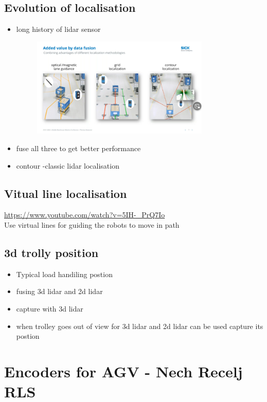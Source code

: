 \documentclass[a4paper]{article}
\begin{document}
\subsection{Evolution of localisation}
\begin{itemize}
	\item long history of lidar sensor
	      \begin{figure}[htpb]
		      \centering
		      \includegraphics[width=0.8\textwidth]{datafusion.png}
		      \caption{}
		      \label{fig:}
	      \end{figure}
	\item fuse all three to get better performance
	\item contour -classic lidar localisation
\end{itemize}
\subsection{Vitual line localisation}
\url{https://www.youtube.com/watch?v=5IH-_PrQ7Io} \\
Use virtual lines for guiding the robots to move in path
\subsection{3d trolly position}
\begin{itemize}
	\item Typical load handiling postion
	\item fusing 3d lidar and 2d lidar
	\item capture with 3d lidar
	\item when trolley goes out of view for 3d lidar and 2d lidar can be used capture its postion
\end{itemize}
\section{Encoders for AGV - Nech Recelj RLS}
\end{document}
